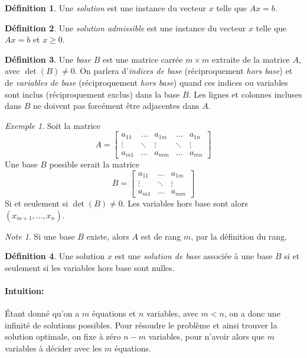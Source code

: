 \documentclass[a4paper]{report}
\theoremstyle{definition}
\newtheorem*{definition}{Définition}
\theoremstyle{remark}
\newtheorem*{note}{Note}
\newtheorem*{example}{Exemple}
\theoremstyle{plain}
\begin{document}
\begin{definition}
Une \emph{solution} est une instance du vecteur \(x\) telle que \(Ax=b\).
\end{definition}

\begin{definition}
Une \emph{solution admissible} est une instance du
vecteur \(x\) telle que \(Ax=b\) et \(x \ge 0\).
\end{definition}

\begin{definition}
Une \emph{base} \(B\) est une matrice carrée \(m\times
m\) extraite de la matrice \(A\), avec \(\det(B)\ne 0\). On parlera
d'\emph{indices de base} (réciproquement \emph{hors base}) et de \emph{variables
de base} (réciproquement \emph{hors base}) quand ces indices ou variables sont
inclus (réciproquement exclus) dans la base \(B\). Les lignes et colonnes
incluses dans \(B\) ne doivent pas forcément être adjacentes dans \(A\).
\begin{example}
Soit la matrice
\[A=\begin{bmatrix}
	a_{11} & \dots  & a_{1m} & \dots  & a_{1n} \\
	\vdots & \ddots & \vdots & \ddots & \vdots \\
	a_{m1} & \dots  & a_{mm} & \dots  & a_{mn}
\end{bmatrix}\]
Une base \(B\) possible serait la matrice
\[B=\begin{bmatrix}
	a_{11} & \dots  & a_{1m} \\
	\vdots & \ddots & \vdots \\
	a_{m1} & \dots  & a_{mm}
\end{bmatrix}\]
Si et seulement si \(\det(B)\neq 0\). Les variables hors base sont alors
\((x_{m+1},\dots,x_{n})\).
\end{example}
\begin{note}
	Si une base \(B\) existe, alors \(A\) est de rang \(m\), par la définition
	du rang.
\end{note}
\end{definition}

\begin{definition}
Une solution \(x\) est une \emph{solution de base}
associée à une base \(B\) si et seulement si les variables hors base sont
nulles.

\paragraph{Intuition:} Étant donné qu'on a \(m\) équations et \(n\) variables,
avec \(m<n\), on a donc une infinité de solutions possibles. Pour résoudre le
problème et ainsi trouver la solution optimale, on fixe à zéro \(n-m\)
variables, pour n'avoir alors que \(m\) variables à décider avec les \(m\)
équations.
\end{definition}
\end{document}
